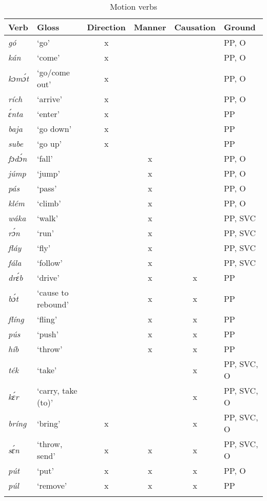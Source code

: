 \begin{table}
\caption{Motion verbs}
\label{tab:key:8.5}

\begin{tabularx}{\textwidth}{lX ccc l}
\lsptoprule
Verb & Gloss & Direction & Manner & Causation & Ground\\
\midrule 
\itshape gó & ‘go’ & x &  &  & PP, O\\
\itshape kán & ‘come’ & x &  &  & PP, O\\
\itshape kɔmɔ́t & ‘go/come out’ & x &  &  & PP, O\\
\itshape rích & ‘arrive’ & x &  &  & PP, O\\
\itshape ɛ́nta & ‘enter’ & x &  &  & PP\\
\itshape baja & ‘go down’ & x &  &  & PP\\
\itshape sube & ‘go up’ & x &  &  & PP\\
\itshape fɔdɔ́n & ‘fall’ &  & x &  & PP, O\\
\itshape júmp & ‘jump’ &  & x &  & PP, O\\
\itshape pás & ‘pass’ &  & x &  & PP, O\\
\itshape klém & ‘climb’ &  & x &  & PP, O\\
\itshape wáka & ‘walk’ &  & x &  & PP, SVC\\
\itshape rɔ́n & ‘run’ &  & x &  & PP, SVC\\
\itshape fláy & ‘fly’ &  & x &  & PP, SVC\\
\itshape fála & ‘follow’ &  & x &  & PP, SVC\\
\itshape drɛ́b & ‘drive’ &  & x & x & PP\\
\itshape bɔ́t & ‘cause to rebound’ &  & x & x & PP\\
\itshape flíng & ‘fling’ &  & x & x & PP\\
\itshape pús & ‘push’ &  & x & x & PP\\
\itshape híb & ‘throw’ &  & x & x & PP\\
\itshape ték & ‘take’ &  &  & x & PP, SVC, O\\
\itshape kɛ́r & ‘carry, take (to)’ &  &  & x & PP, SVC, O\\
\itshape bríng & ‘bring’ & x &  & x & PP, SVC, O\\
\itshape sɛ́n & ‘throw, send’ & x & x & x & PP, SVC, O\\
\itshape pút & ‘put’ & x & x & x & PP, O\\
\itshape púl & ‘remove’ & x & x & x & PP\\
\lspbottomrule
\end{tabularx}
\end{table}
